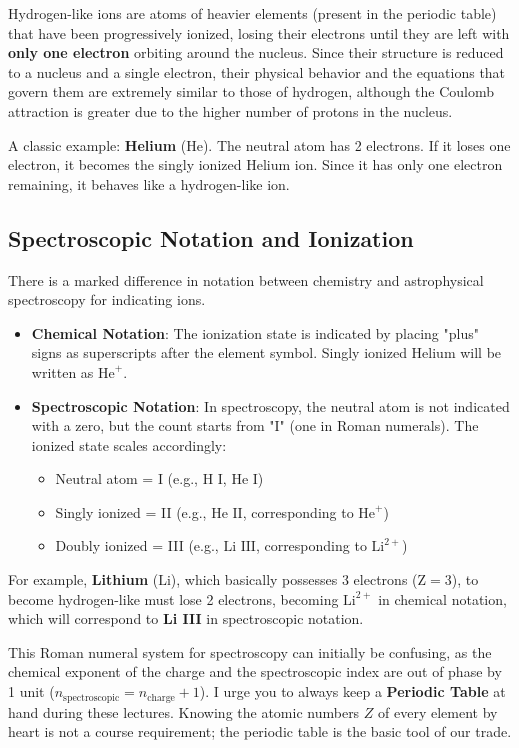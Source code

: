 Hydrogen-like ions are atoms of heavier elements (present in the periodic table) that have been progressively ionized, losing their electrons until they are left with \textbf{only one electron} orbiting around the nucleus.
Since their structure is reduced to a nucleus and a single electron, their physical behavior and the equations that govern them are extremely similar to those of hydrogen, although the Coulomb attraction is greater due to the higher number of protons in the nucleus.

A classic example: \textbf{Helium} (He). The neutral atom has 2 electrons. If it loses one electron, it becomes the singly ionized Helium ion. Since it has only one electron remaining, it behaves like a hydrogen-like ion.

\subsection{Spectroscopic Notation and Ionization}

There is a marked difference in notation between chemistry and astrophysical spectroscopy for indicating ions.
\begin{itemize}
\item \textbf{Chemical Notation}: The ionization state is indicated by placing "plus" signs as superscripts after the element symbol. Singly ionized Helium will be written as $\text{He}^+$.
\item \textbf{Spectroscopic Notation}: In spectroscopy, the neutral atom is not indicated with a zero, but the count starts from "I" (one in Roman numerals). The ionized state scales accordingly:
\begin{itemize}
\item Neutral atom = I (e.g., $\text{H I}$, $\text{He I}$)
\item Singly ionized = II (e.g., $\text{He II}$, corresponding to $\text{He}^+$)
\item Doubly ionized = III (e.g., $\text{Li III}$, corresponding to $\text{Li}^{2+}$)
\end{itemize}
\end{itemize}
For example, \textbf{Lithium} ($\text{Li}$), which basically possesses 3 electrons ($\text{Z}=3$), to become hydrogen-like must lose 2 electrons, becoming $\text{Li}^{2+}$ in chemical notation, which will correspond to \textbf{Li III} in spectroscopic notation.

This Roman numeral system for spectroscopy can initially be confusing, as the chemical exponent of the charge and the spectroscopic index are out of phase by 1 unit ($n_{\text{spectroscopic}} = n_{\text{charge}} + 1$). I urge you to always keep a \textbf{Periodic Table} at hand during these lectures. Knowing the atomic numbers $Z$ of every element by heart is not a course requirement; the periodic table is the basic tool of our trade.

